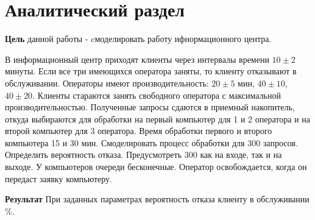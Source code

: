 \chapter{Аналитический раздел}

\textbf{Цель} данной работы - cмоделировать работу ифнормационного центра. 

В информационный центр приходят клиенты через интервалы времени $10\pm2$ минуты. Если все три имеющихся оператора заняты, то клиенту отказывают в обслуживании. Операторы имеют производительность: $20\pm5$ мин, $40\pm10$, $40\pm20$. Клиенты стараются занять свободного оператора с максимальной производительностью. Полученные запросы сдаются в приемный накопитель, откуда выбираются для обработки на первый компьютер для 1 и 2 оператора и на второй компьютер для 3 оператора. Время обработки первого и второго компьютера 15 и 30 мин.
Смоделировать процесс обработки для 300 запросов. Определить вероятность отказа.
Предусмотреть 300 как на входе, так и на выходе. У компьютеров очереди бесконечные. Оператор освобождается, когда он передаст заявку компьютеру.

\textbf{Результат} При заданных параметрах вероятность отказа клиенту в обслуживании \%. 